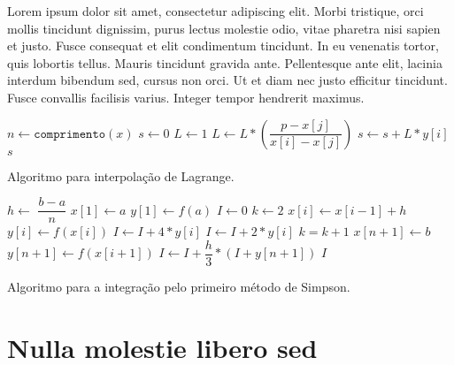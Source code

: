 
\label{Cap:Implementacao}
Lorem ipsum dolor sit amet, consectetur adipiscing elit. Morbi tristique, orci mollis tincidunt dignissim, purus lectus molestie odio, vitae pharetra nisi sapien et justo. Fusce consequat et elit condimentum tincidunt. In eu venenatis tortor, quis lobortis tellus. Mauris tincidunt gravida ante. Pellentesque ante elit, lacinia interdum bibendum sed, cursus non orci. Ut et diam nec justo efficitur tincidunt. Fusce convallis facilisis varius. Integer tempor hendrerit maximus.

\begin{algorithm}
{}
$n \leftarrow \mathtt{comprimento}(x)$\;
$s \leftarrow 0$\;
 {
	$L \leftarrow 1$\;
	 {
		 {
			$L \leftarrow L* \left( \dfrac{p-x[j]}{x[i]-x[j]} \right) $
		}
	}
	$s \leftarrow s + L*y[i]$\;
}
\Retorna $s$\;
\caption{Algoritmo para interpolação de Lagrange.}
\label{algo:1}
\end{algorithm}

\begin{algorithm}
{}
$h \leftarrow$ $\dfrac{b-a}{n}$\;
$x[1] \leftarrow a$\;
$y[1] \leftarrow f(a)$\;
$I \leftarrow 0$\;
$k \leftarrow 2$\;
 {
	$x[i] \leftarrow x[i-1] + h$\;
	$y[i] \leftarrow f(x[i])$\;
	 {
		$I \leftarrow I + 4*y[i]$\;
	}
	{
		$I \leftarrow I + 2*y[i]$\;
	}
	$k = k+1$\;
}
$x[n+1] \leftarrow b$\;
$y[n+1] \leftarrow f(x[i+1])$\;
$I \leftarrow I + \dfrac{h}{3}*(I + y[n+1])$\;
\Retorna $I$\;
\caption{Algoritmo para a integração pelo primeiro método de Simpson.}
\label{algo:2}
\end{algorithm}



\section{Nulla molestie libero sed}
\label{Sec:expressoesMatematicas}

